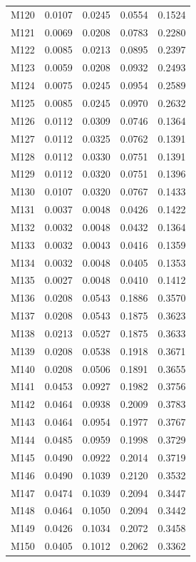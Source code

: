 \begin{longtable}{lrrrr}
M120 & 0.0107 & 0.0245 & 0.0554 & 0.1524 \\
M121 & 0.0069 & 0.0208 & 0.0783 & 0.2280 \\
M122 & 0.0085 & 0.0213 & 0.0895 & 0.2397 \\
M123 & 0.0059 & 0.0208 & 0.0932 & 0.2493 \\
M124 & 0.0075 & 0.0245 & 0.0954 & 0.2589 \\
M125 & 0.0085 & 0.0245 & 0.0970 & 0.2632 \\
M126 & 0.0112 & 0.0309 & 0.0746 & 0.1364 \\
M127 & 0.0112 & 0.0325 & 0.0762 & 0.1391 \\
M128 & 0.0112 & 0.0330 & 0.0751 & 0.1391 \\
M129 & 0.0112 & 0.0320 & 0.0751 & 0.1396 \\
M130 & 0.0107 & 0.0320 & 0.0767 & 0.1433 \\
M131 & 0.0037 & 0.0048 & 0.0426 & 0.1422 \\
M132 & 0.0032 & 0.0048 & 0.0432 & 0.1364 \\
M133 & 0.0032 & 0.0043 & 0.0416 & 0.1359 \\
M134 & 0.0032 & 0.0048 & 0.0405 & 0.1353 \\
M135 & 0.0027 & 0.0048 & 0.0410 & 0.1412 \\
M136 & 0.0208 & 0.0543 & 0.1886 & 0.3570 \\
M137 & 0.0208 & 0.0543 & 0.1875 & 0.3623 \\
M138 & 0.0213 & 0.0527 & 0.1875 & 0.3633 \\
M139 & 0.0208 & 0.0538 & 0.1918 & 0.3671 \\
M140 & 0.0208 & 0.0506 & 0.1891 & 0.3655 \\
M141 & 0.0453 & 0.0927 & 0.1982 & 0.3756 \\
M142 & 0.0464 & 0.0938 & 0.2009 & 0.3783 \\
M143 & 0.0464 & 0.0954 & 0.1977 & 0.3767 \\
M144 & 0.0485 & 0.0959 & 0.1998 & 0.3729 \\
M145 & 0.0490 & 0.0922 & 0.2014 & 0.3719 \\
M146 & 0.0490 & 0.1039 & 0.2120 & 0.3532 \\
M147 & 0.0474 & 0.1039 & 0.2094 & 0.3447 \\
M148 & 0.0464 & 0.1050 & 0.2094 & 0.3442 \\
M149 & 0.0426 & 0.1034 & 0.2072 & 0.3458 \\
M150 & 0.0405 & 0.1012 & 0.2062 & 0.3362 \\

\end{longtable}

